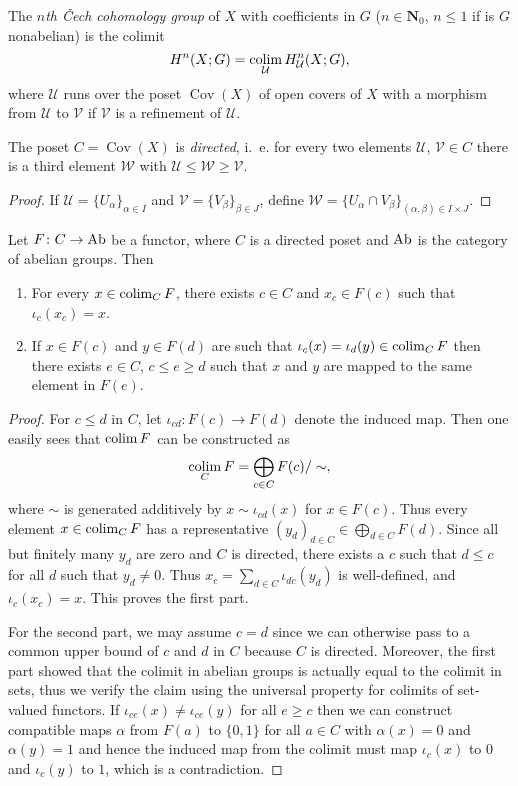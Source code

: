 \documentclass[a4paper,openany]{scrbook}
\DeclareMathOperator{\Cov}{Cov}
\begin{document}
\begin{defn}
The \emph{$n$th Čech cohomology group} of $X$ with coefficients in $G$ ($n \in \mathbf N_0$, $n \leq 1$ if is $G$ nonabelian) is the colimit
\[
H^n(X;G) = \operatorname*{colim}_{\mathcal U} H^n_{\mathcal U}(X;G),
\]
where $\mathcal U$ runs over the poset $\Cov(X)$ of open covers of $X$ with a morphism from $\mathcal U$ to $\mathcal V$ if $\mathcal V$ is a refinement of $\mathcal U$.
\end{defn}


\begin{lemma}
The poset $C = \Cov(X)$ is \emph{directed}, i.~e. for every two elements $\mathcal U$, $\mathcal V \in C$ there is a third element $\mathcal W$ with $\mathcal U \leq \mathcal W \geq \mathcal V$.
\end{lemma}
\begin{proof}
If $\mathcal U = \{U_\alpha\}_{\alpha \in I}$ and $\mathcal V = \{V_\beta\}_{\beta \in J}$, define $\mathcal W = \{U_\alpha \cap V_\beta\}_{(\alpha,\beta) \in I \times J}$.
\end{proof}

\begin{lemma}\label{lemma:dircolimitofabeliangroups}
Let $F\colon C \to \operatorname{Ab}$ be a functor, where $C$ is a directed poset and $\operatorname{Ab}$ is the category of abelian groups. Then
\begin{enumerate}
\item For every $x \in \operatorname*{colim}_C F$, there exists $c \in C$ and $x_c \in F(c)$ such that $\iota_c(x_c)=x$.
\item If $x \in F(c)$ and $y \in F(d)$ are such that $\iota_c(x)=\iota_d(y) \in \operatorname*{colim}_C F$ then there exists $e \in C$, $c \leq e \geq d$ such that $x$ and $y$ are mapped to the same element in $F(e)$.
\end{enumerate}
\end{lemma}
\begin{proof}
For $c \leq d$ in $C$, let $\iota_{cd}\colon F(c) \to F(d)$ denote the induced map. Then one easily sees that $\operatorname*{colim} F$ can be constructed as
\[
\operatorname*{colim}_C F = \bigoplus_{c \in C} F(c)/\sim,
\]
where $\sim$ is generated additively by $x \sim \iota_{cd}(x)$ for $x \in F(c)$. Thus every element $x \in \operatorname*{colim}_C F$ has a representative $(y_d)_{d \in C} \in \bigoplus_{d \in C} F(d)$. Since all but finitely many $y_d$ are zero and $C$ is directed, there exists a $c$ such that $d \leq c$ for all $d$ such that $y_d \neq 0$. Thus $x_c = \sum_{d \in C} \iota_{dc}(y_d)$ is well-defined, and $\iota_c(x_c) = x$. This proves the first part.

For the second part, we may assume $c=d$ since we can otherwise pass to a common upper bound of $c$ and $d$ in $C$ because $C$ is directed. Moreover, the first part showed that the colimit in abelian groups is actually equal to the colimit in sets, thus we verify the claim using the universal property for colimits of set-valued functors.
If $\iota_{ce}(x) \neq \iota_{ce}(y)$ for all $e \geq c$ then we can construct compatible maps $\alpha$ from $F(a)$ to $\{0,1\}$ for all $a \in C$ with $\alpha(x) = 0$ and $\alpha(y) = 1$ and hence the induced map from the colimit must map $\iota_c(x)$ to $0$ and $\iota_c(y)$ to $1$, which is a contradiction.
\end{proof}
\end{document}
